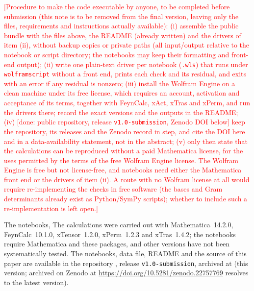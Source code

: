 \documentclass[prd,aps,preprint,superscriptaddress,nofootinbib,amsmath,amssymb,eqsecnum]{revtex4-2}
\newcommand{\todo}[1]{\textcolor{red}{[#1]}}
\providecommand{\DIFaddtex}[1]{{\protect\color{blue} \sf #1}} %
\providecommand{\DIFdeltex}[1]{{\protect\color{red} \scriptsize #1}} %
\providecommand{\DIFaddbegin}{} %
\providecommand{\DIFaddend}{} %
\providecommand{\DIFdelbegin}{} %
\providecommand{\DIFdelend}{} %
\providecommand{\DIFadd}[1]{\texorpdfstring{\DIFaddtex{#1}}{#1}} %
\providecommand{\DIFdel}[1]{\texorpdfstring{\DIFdeltex{#1}}{}} %
\begin{document}
\DIFdelbegin \DIFdel{\todo{Procedure to make the code executable by anyone, to be completed before submission
(this note is to be removed from the final version, leaving only the files, requirements and
instructions actually available):
(i) assemble the public bundle with the files above, the README (already written) and the
drivers of item (ii), without backup copies or private paths (all input/output relative to the notebook or
script directory; the notebooks may keep their formatting and front-end output);
(ii) write one plain-text driver per notebook
(\texttt{.wls}) that runs under \texttt{wolframscript} without a front end, prints each
check and its residual, and exits with an error if any residual is nonzero;
(iii) install the Wolfram Engine on a clean machine under its free license, which requires
an account, activation and acceptance of its terms,
together with FeynCalc, xAct, xTras and xPerm, and run the drivers there; record the exact
versions and the outputs in the README; (iv) [done: public repository, release \texttt{v1.0-submission}, Zenodo DOI below]
keep the repository, its releases and the Zenodo record in step, and cite the DOI here and
in a data-availability statement, not in the abstract; (v) only then state that the calculations can be
reproduced without a paid Mathematica license, for the uses permitted by the terms of the
free Wolfram Engine license. The Wolfram Engine is free but not license-free, and
notebooks need either the Mathematica front end or the drivers of item (ii). A route with no Wolfram license at all would require re-implementing
the checks in free software (the bases and Gram determinants already exist as Python/SymPy
scripts); whether to include such a re-implementation is left open.}
}%

\DIFdel{The notebooks, }\DIFdelend \DIFaddbegin \DIFadd{The calculations were carried out with Mathematica~14.2.0, FeynCalc~10.1.0, xTensor~1.2.0,
xPerm~1.2.3 and xTras~1.4.2; the notebooks require Mathematica and these packages, and other
versions have not been systematically tested. The notebooks, }\DIFaddend data file, README and the source
of this paper are \DIFdelbegin \DIFdel{available in the
repository }%
\DIFdel{, release
\texttt{v1.0-submission}, archived at }%
\DIFdel{(this
version; }\DIFdelend \DIFaddbegin \DIFadd{archived on Zenodo at }\DIFaddend \url{https://doi.org/10.5281/zenodo.22757769}\DIFdelbegin \DIFdel{resolves to the latest version)}\DIFdelend .




\end{document}
